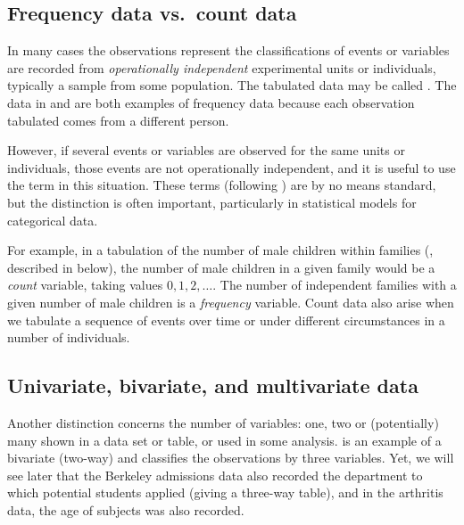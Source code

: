 \documentclass[11pt]{book}
\begin{document}
\subsection{Frequency data vs.\ count data}\label{sec:freq-count}
In many cases the observations represent the classifications of events or variables are 
recorded from \emph{operationally independent} experimental units or individuals, typically
a sample from some population.  The tabulated data may be called
.  The data in  and 
are both examples of frequency data because each observation tabulated
comes from a different person.

However, if several events or variables are observed for the same units or individuals, those events are not
operationally independent, and it is useful to use the term 
 in this situation.  These terms (following
\citet{Lindsey:95}) are by no means standard, but
the distinction is often important, particularly in statistical
models for categorical data.  

For example, in a tabulation of the number of male
children within families (, described in
 below), 
the number of male children in a given family would be a \emph{count} variable,
taking values $0, 1, 2, \dots$.  The number of independent families with
a given number of male children is a \emph{frequency} variable.
Count data also arise when we tabulate a sequence of events over time
or under different circumstances in a number of individuals.



\subsection{Univariate, bivariate, and multivariate data}\label{sec:uni-multi}
Another distinction concerns the number of variables: one, two or
(potentially) many shown in a data set or table, or used in some
analysis.
 is an example of a bivariate (two-way) \ctab
and  classifies the observations by three variables.
Yet, we will see later
that the Berkeley admissions data also recorded
the department to which potential students applied (giving a three-way
table), and in the arthritis data, the age of subjects was also
recorded.
\end{document}
